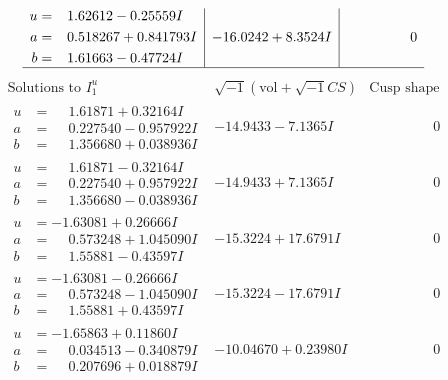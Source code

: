 \documentclass[1p]{elsarticle_modified}
\theoremstyle{definition}
\newcommand{\I}{\sqrt{-1}}
\begin{document}
$$\begin{array}{c|c|c}
\begin{aligned}
u &= \phantom{-}1.62612 - 0.25559 I \\
a &= \phantom{-}0.518267 + 0.841793 I \\
b &= \phantom{-}1.61663 - 0.47724 I\end{aligned}
 & -16.0242 + 8.3524 I & \phantom{-0.000000 } 0\\
 \hline 
 \end{array}$$\newpage$$\begin{array}{c|c|c}  
\text{Solutions to }I^u_{1}& \I (\text{vol} + \sqrt{-1}CS) & \text{Cusp shape}\\
 \hline 
\begin{aligned}
u &= \phantom{-}1.61871 + 0.32164 I \\
a &= \phantom{-}0.227540 - 0.957922 I \\
b &= \phantom{-}1.356680 + 0.038936 I\end{aligned}
 & -14.9433 - 7.1365 I & \phantom{-0.000000 } 0 \\ \hline\begin{aligned}
u &= \phantom{-}1.61871 - 0.32164 I \\
a &= \phantom{-}0.227540 + 0.957922 I \\
b &= \phantom{-}1.356680 - 0.038936 I\end{aligned}
 & -14.9433 + 7.1365 I & \phantom{-0.000000 } 0 \\ \hline\begin{aligned}
u &= -1.63081 + 0.26666 I \\
a &= \phantom{-}0.573248 + 1.045090 I \\
b &= \phantom{-}1.55881 - 0.43597 I\end{aligned}
 & -15.3224 + 17.6791 I & \phantom{-0.000000 } 0 \\ \hline\begin{aligned}
u &= -1.63081 - 0.26666 I \\
a &= \phantom{-}0.573248 - 1.045090 I \\
b &= \phantom{-}1.55881 + 0.43597 I\end{aligned}
 & -15.3224 - 17.6791 I & \phantom{-0.000000 } 0 \\ \hline\begin{aligned}
u &= -1.65863 + 0.11860 I \\
a &= \phantom{-}0.034513 - 0.340879 I \\
b &= \phantom{-}0.207696 + 0.018879 I\end{aligned}
 & -10.04670 + 0.23980 I & \phantom{-0.000000 } 0 \\ \hline\begin{aligned}

\end{aligned}
\end{array}$$
\end{document}
